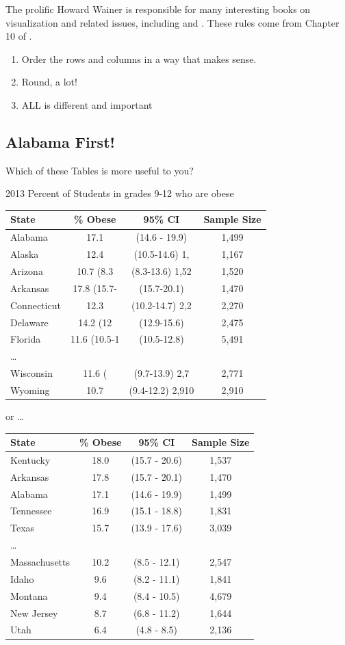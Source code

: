 \documentclass[
]{book}
\providecommand{\tightlist}{%
  \setlength{\itemsep}{0pt}\setlength{\parskip}{0pt}}
\begin{document}
The prolific Howard Wainer is responsible for many interesting books on visualization and related issues, including \citet{HW_GraphicDiscovery} and \citet{HW_MedicalIlluminations}. These rules come from Chapter 10 of \citet{HW_VisualRevelations}.

\begin{enumerate}
\def\labelenumi{\arabic{enumi}.}
\tightlist
\item
  Order the rows and columns in a way that makes sense.
\item
  Round, a lot!
\item
  ALL is different and important
\end{enumerate}

\hypertarget{alabama-first}{%
\subsection{Alabama First!}\label{alabama-first}}

Which of these Tables is more useful to you?

2013 Percent of Students in grades 9-12 who are obese

\begin{longtable}[]{@{}lccc@{}}
\toprule
State & \% Obese & 95\% CI & Sample Size\tabularnewline
\midrule
\endhead
Alabama & 17.1 & (14.6 - 19.9) & 1,499\tabularnewline
Alaska & 12.4 & (10.5-14.6) \textbar{} 1, & 1,167\tabularnewline
Arizona & 10.7 \textbar{} (8.3 & (8.3-13.6) \textbar{} 1,52 & 1,520\tabularnewline
Arkansas & 17.8 \textbar{} (15.7- & (15.7-20.1) \textbar{} & 1,470\tabularnewline
Connecticut & 12.3 \textbar{} & (10.2-14.7) \textbar{} 2,2 & 2,270\tabularnewline
Delaware & 14.2 \textbar{} (12 & (12.9-15.6) \textbar{} & 2,475\tabularnewline
Florida & 11.6 \textbar{} (10.5-1 & (10.5-12.8) \textbar{} & 5,491\tabularnewline
\ldots{} & & &\tabularnewline
Wisconsin & 11.6 \textbar{} ( & (9.7-13.9) \textbar{} 2,7 & 2,771\tabularnewline
Wyoming & 10.7 & (9.4-12.2) \textbar{} 2,910 & 2,910\tabularnewline
\bottomrule
\end{longtable}

or \ldots{}

\begin{longtable}[]{@{}lccc@{}}
\toprule
State & \% Obese & 95\% CI & Sample Size\tabularnewline
\midrule
\endhead
Kentucky & 18.0 & (15.7 - 20.6) & 1,537\tabularnewline
Arkansas & 17.8 & (15.7 - 20.1) & 1,470\tabularnewline
Alabama & 17.1 & (14.6 - 19.9) & 1,499\tabularnewline
Tennessee & 16.9 & (15.1 - 18.8) & 1,831\tabularnewline
Texas & 15.7 & (13.9 - 17.6) & 3,039\tabularnewline
\ldots{} & & &\tabularnewline
Massachusetts & 10.2 & (8.5 - 12.1) & 2,547\tabularnewline
Idaho & 9.6 & (8.2 - 11.1) & 1,841\tabularnewline
Montana & 9.4 & (8.4 - 10.5) & 4,679\tabularnewline
New Jersey & 8.7 & (6.8 - 11.2) & 1,644\tabularnewline
Utah & 6.4 & (4.8 - 8.5) & 2,136\tabularnewline
\bottomrule
\end{longtable}
\end{document}
